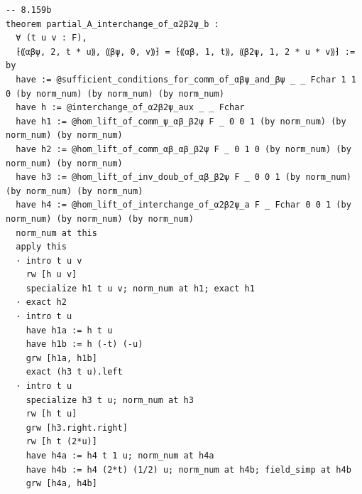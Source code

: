 \begin{Verbatim}
-- 8.159b
theorem partial_A_interchange_of_α2β2ψ_b :
  ∀ (t u v : F),
  ⁅⸨αβψ, 2, t * u⸩, ⸨βψ, 0, v⸩⁆ = ⁅⸨αβ, 1, t⸩, ⸨β2ψ, 1, 2 * u * v⸩⁆ := by
  have := @sufficient_conditions_for_comm_of_αβψ_and_βψ _ _ Fchar 1 1 0 (by norm_num) (by norm_num) (by norm_num)
  have h := @interchange_of_α2β2ψ_aux _ _ Fchar
  have h1 := @hom_lift_of_comm_ψ_αβ_β2ψ F _ 0 0 1 (by norm_num) (by norm_num) (by norm_num)
  have h2 := @hom_lift_of_comm_αβ_αβ_β2ψ F _ 0 1 0 (by norm_num) (by norm_num) (by norm_num)
  have h3 := @hom_lift_of_inv_doub_of_αβ_β2ψ F _ 0 0 1 (by norm_num) (by norm_num) (by norm_num)
  have h4 := @hom_lift_of_interchange_of_α2β2ψ_a F _ Fchar 0 0 1 (by norm_num) (by norm_num) (by norm_num)
  norm_num at this
  apply this
  · intro t u v
    rw [h u v]
    specialize h1 t u v; norm_num at h1; exact h1
  · exact h2
  · intro t u
    have h1a := h t u
    have h1b := h (-t) (-u)
    grw [h1a, h1b]
    exact (h3 t u).left
  · intro t u
    specialize h3 t u; norm_num at h3
    rw [h t u]
    grw [h3.right.right]
    rw [h t (2*u)]
    have h4a := h4 t 1 u; norm_num at h4a
    have h4b := h4 (2*t) (1/2) u; norm_num at h4b; field_simp at h4b
    grw [h4a, h4b]


\end{Verbatim}
